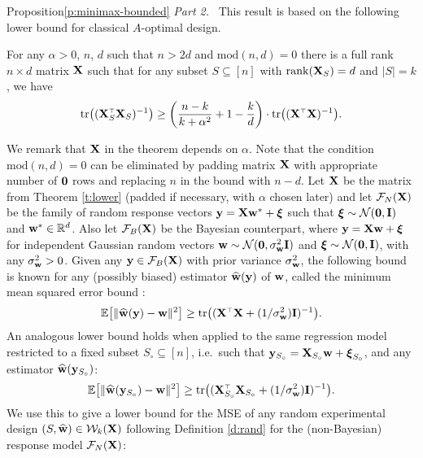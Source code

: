 \documentclass[12pt]{sty/colt2019/colt2018-arxiv}
\begin{document}
\begin{proofof}{Proposition}{\ref{p:minimax-bounded}}
\textit{Part 2.} \ This result is based on the following lower bound for
classical $A$-optimal design.
\begin{theorem}\label{t:lower}
  For any $\alpha>0$, $n$, $d$ such that $n>2d$ and
  $\mathrm{mod}(n,d)=0$ there is a full rank $n\times d$ matrix $\mathbf X$
  such that for any subset $S\subseteq[n]$
  with $\mathrm{rank}(\mathbf X_S)=d$ and $|S|=k$, we have
  \begin{align*}
    \tr\big((\X_S^\top\X_S)^{-1}\big)\geq
    \bigg(\frac{n-k}{k+\alpha^2}+1-\frac kd\bigg)\cdot\tr\big((\X^\top\X)^{-1}\big).
  \end{align*}
\end{theorem}
We remark that $\mathbf X$ in the theorem depends on $\alpha$.
Note that the condition $\mathrm{mod}(n,d)=0$ can be eliminated by
padding matrix $\mathbf X$ with appropriate number of $\mathbf 0$ rows and
replacing $n$ in the bound with $n-d$. Let $\mathbf X$ be the
matrix from Theorem \ref{t:lower} (padded if necessary, with $\alpha$
chosen later) and let
  $\mathcal{F}_N(\mathbf X)$ be the family of random response vectors $\mathbf y=\mathbf X\mathbf w^*+\boldsymbol\xi$
  such that $\boldsymbol\xi\sim\mathcal{N}(\mathbf 0,\mathbf I)$ and $\mathbf w^*\in\mathbb R^d$. 
Also let $\mathcal{F}_B(\mathbf X)$ be the Bayesian counterpart, where $\mathbf y=\mathbf X\mathbf w+\boldsymbol\xi$
for independent Gaussian random vectors
$\mathbf w\sim\mathcal{N}(\mathbf 0,\sigma_\mathbf w^2\mathbf I)$ and $\boldsymbol\xi\sim\mathcal{N}(\mathbf 0,\mathbf I)$, with any
$\sigma_\mathbf w^2>0$. Given any $\mathbf y\in\mathcal{F}_B(\mathbf X)$ with prior variance
$\sigma_\mathbf w^2$, the following bound is known for any (possibly biased)
estimator $\widehat{\mathbf w}(\mathbf y)$ of $\mathbf w$, called the minimum mean squared error
bound \citep[MMSE; see][]{gray-davisson-stats-book}: 
\begin{align*}
  \E\big[\|\wbh(\y)-\w\|^2\big] \geq \tr\big((\X^\top\X+(1/\sigma_\w^2)\I)^{-1}\big).
\end{align*}
An analogous lower bound holds when applied to the same regression model
restricted to a fixed subset $S_\circ\subseteq[n]$,
i.e.~such that $\mathbf y_{S_\circ}=\mathbf X_{S_\circ}\mathbf w+\boldsymbol\xi_{S_\circ}$, and any estimator
$\widehat{\mathbf w}(\mathbf y_{S_\circ})$: 
\begin{align}
  \E\big[\|\wbh(\y_{S_\circ})-\w\|^2\big]\geq \tr\big((\X_{S_\circ}^\top\X_{S_\circ}+(1/\sigma_\w^2)\I)^{-1}\big).\label{eq:bayes}
\end{align}
We use this to give a lower bound for the MSE of any random experimental
design $(S,\widehat{\mathbf w})\in\mathcal{W}_k(\mathbf X)$ following Definition \ref{d:rand} for
the (non-Bayesian) response model $\mathcal{F}_N(\mathbf X)$:
\begin{align*}

\end{align*}
\end{proofof}
\end{document}
